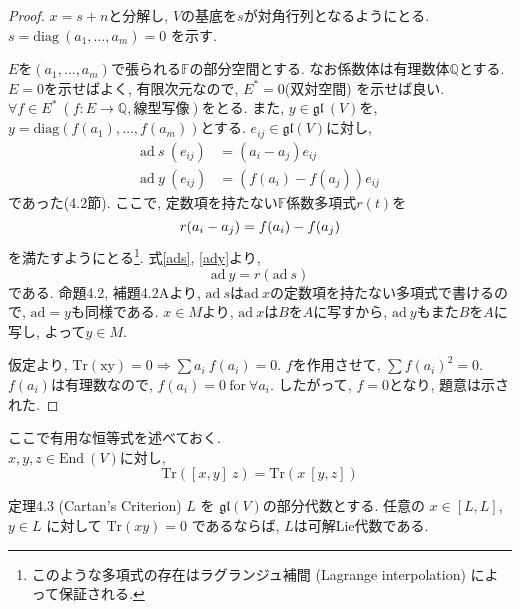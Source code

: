 \documentclass[a4paper,12pt]{ltjsarticle}
\begin{document}
\begin{proof}
  $x = s + n$と分解し, $V$の基底を$s$が対角行列となるようにとる. $s = \mathrm{diag}~(a_1, \ldots, a_m) = 0$ を示す. 

  $E$を$(a_1, \ldots, a_m)$で張られる$𝔽$の部分空間とする. なお係数体は有理数体$ℚ$とする. $E = 0$を示せばよく, 有限次元なので, $E^* = 0$(双対空間) を示せば良い. \\
  $∀f \in E^* ~(f: E \rightarrow ℚ, 線型写像)$をとる. また, $y \in \mathfrak{gl}~(V)$を, $y = \mathrm{diag}(f(a_1), \ldots, f(a_m))$とする. 
  $e_{ij} \in \mathfrak{gl}(V)$に対し, 
  \begin{align}
    \mathrm{ad}~s ~(e_{ij}) &= (a_i - a_j) e_{ij} \label{ads} \\
    \mathrm{ad}~y ~(e_{ij}) &= (f(a_i) - f(a_j)) e_{ij} \label{ady}
  \end{align}
  であった(4.2節). ここで, 定数項を持たない$𝔽$係数多項式$r(t)$を
  \begin{equation}
    r(a_i - a_j) = f(a_i) - f(a_j) \\
  \end{equation}
  を満たすようにとる\footnote{このような多項式の存在はラグランジュ補間 (Lagrange interpolation) によって保証される. }. 式\eqref{ads}, \eqref{ady}より, 
  \begin{equation}
    \mathrm{ad}~y = r(\mathrm{ad}~s)
  \end{equation}
  である. 命題4.2, 補題4.2Aより, 
  $\mathrm{ad}~s$は$\mathrm{ad}~x$の定数項を持たない多項式で書けるので, $\mathrm{ad}=y$も同様である. $x \in M$より, $\mathrm{ad}~x$は$B$を$A$に写すから, $\mathrm{ad}~y$もまた$B$を$A$に写し, よって$y \in M$. 

  仮定より, $\mathrm{Tr(xy)} = 0 \Rightarrow \sum a_i ~ f(a_i) = 0$. 
  $f$を作用させて, $\sum f(a_i)^2 = 0$. $f(a_i)$は有理数なので, $f(a_i) = 0 ~\mathrm{for}~ ∀a_i$. したがって, $f = 0$となり, 題意は示された. 
\end{proof}


ここで有用な恒等式を述べておく. \\
$x, y, z \in \mathrm{End}~(V)$に対し, 
\begin{equation}
  \mathrm{Tr} ([x, y]~ z) = \mathrm{Tr} (x ~[y, z]) \label{trace}
\end{equation}


\begin{thm}{定理4.3 (Cartan's Criterion)}
  $L$ を $\mathfrak{gl}(V)$の部分代数とする. 任意の $x \in [L, L]$, $y \in L$ に対して $\mathrm{Tr} (xy) = 0$ であるならば, $L$は可解Lie代数である. 
\end{thm}
\end{document}
